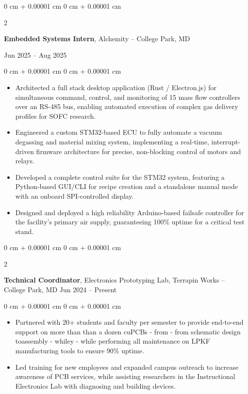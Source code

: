 \documentclass[10pt, letterpaper]{article}
\newenvironment{highlights}{
    \begin{itemize}[
        topsep=0.10 cm,
        parsep=0.10 cm,
        partopsep=0pt,
        itemsep=0pt,
        leftmargin=0 cm + 10pt
    ]
}{
    \end{itemize}
} %
\newenvironment{onecolentry}{
    \begin{adjustwidth}{
        0 cm + 0.00001 cm
    }{
        0 cm + 0.00001 cm
    }
}{
    \end{adjustwidth}
} %
\newenvironment{twocolentry}[2][]{
    \onecolentry
    \def\secondColumn{#2}
    \setcolumnwidth{\fill, 4.5 cm}
    \begin{paracol}{2}
}{
    \switchcolumn \raggedleft \secondColumn
    \end{paracol}
    \endonecolentry
} %
\begin{document}
        \begin{twocolentry}{
            Jun 2025 – Aug 2025
        }
            \textbf{Embedded Systems Intern}, Alchemity -- College Park, MD
        \end{twocolentry}
        \vspace{0.10 cm}
        \begin{onecolentry}
            \begin{highlights}
                \item Architected a full stack desktop application (Rust / Electron.js) for simultaneous command, control, and monitoring of 15 mass flow controllers over an RS-485 bus, enabling automated execution of complex gas delivery profiles for SOFC research.
                \item Engineered a custom STM32-based ECU to fully automate a vacuum degassing and material mixing system, implementing a real-time, interrupt-driven firmware architecture for precise, non-blocking control of motors and relays.
                \item Developed a complete control suite for the STM32 system, featuring a Python-based GUI/CLI for recipe creation and a standalone manual mode with an onboard SPI-controlled display.
                \item Designed and deployed a high reliability Arduino-based failsafe controller for the facility's primary air supply, guaranteeing 100\% uptime for a critical test stand.
            \end{highlights}
        \end{onecolentry}

        \vspace{0.2 cm}

        \begin{twocolentry}{
            Jun 2024 – Present
        }
            \textbf{Technical Coordinator}, Electronics Prototyping Lab, Terrapin Works -- College Park, MD \end{twocolentry}
        \vspace{0.10 cm}
        \begin{onecolentry}
            \begin{highlights}
                \item Partnered with 20+ students and faculty per semester to provide end-to-end support on more than than a dozen cuPCBs - from - from schematic design toassembly - whiley - while performing all maintenance on LPKF manufacturing tools to ensure 90\% uptime.
                \item Led training for new employees and expanded campus outreach to increase awareness of PCB services, while assisting researchers in the Instructional Electronics Lab with diagnosing and building devices.
            \end{highlights}
        \end{onecolentry}
        
\end{document}
